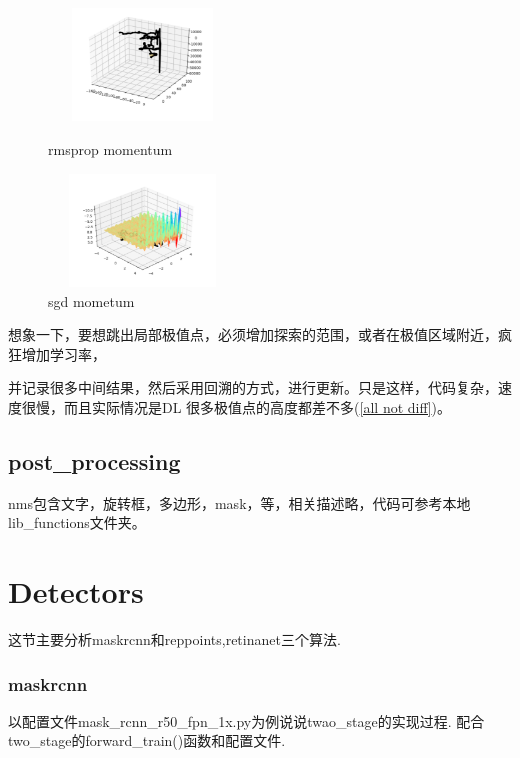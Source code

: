 \documentclass[UTF8]{ctexart}
\begin{document}
\begin{figure}[htbp]
	\centering
	\begin{minipage}[t]{0.48\textwidth}
	\centering
	\includegraphics[width=5cm, height=3cm]{./pic/rmsprop_momentum.png}
	\caption{rmsprop momentum}
	\end{minipage}
	\begin{minipage}[t]{0.48\textwidth}
	\centering
	\includegraphics[width=5cm,height=3cm]{./pic/sgd_mometum.png}
	\caption{sgd mometum}
	\label{decent curve}
	\end{minipage}
\end{figure}

想象一下，要想跳出局部极值点，必须增加探索的范围，或者在极值区域附近，疯狂增加学习率，

并记录很多中间结果，然后采用回溯的方式，进行更新。只是这样，代码复杂，速度很慢，而且实际情况是DL
很多极值点的高度都差不多(\ref{all not diff})。


\subsection{post\_processing}
nms包含文字，旋转框，多边形，mask，等，相关描述略，代码可参考本地lib\_functions文件夹。



\section{Detectors}

这节主要分析maskrcnn和reppoints,retinanet三个算法.

\subsubsection{maskrcnn}
\label{maskrcnn}
以配置文件mask\_rcnn\_r50\_fpn\_1x.py为例说说twao\_stage的实现过程.
配合two\_stage的forward\_train()函数和配置文件.
\end{document}
